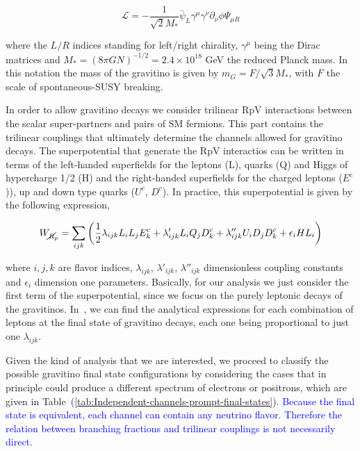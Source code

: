 \documentclass[a4paper,11pt]{article}
\newcommand*{\blue}{\textcolor{blue}}
\begin{document}
\begin{equation}
  \mathcal{L} = −\frac{1}{\sqrt{2}M_*}\bar{\psi}_L\gamma^\mu\gamma^\nu\partial_\nu\phi\Psi_{\mu R}
\end{equation}

\noindent where the $L/R$ indices standing for left/right chirality, $\gamma^\mu$ being the Dirac matrices and $M_* = (8\pi G N)^{-1/2} = 2.4\times 10^{18}$ GeV the reduced Planck mass. In this notation the mass of the gravitino is given by $m_G = F/\sqrt{3}M_*$, with $F$ the scale of spontaneous-SUSY breaking.

In order to allow gravitino decays we consider trilinear RpV interactions between the scalar super-partners and pairs of SM fermions. This part contains the trilinear couplings that ultimately determine the channels allowed for gravitino decays. The superpotential that generate the RpV interactios can be written in terms of the left-handed superfields for the leptons (L), quarks (Q) and Higgs of hypercharge 1/2 (H) and the right-handed superfields for the charged leptons ($E^c$)), up and down type quarks ($U^c$, $D^c$). In practice, this superpotential is given by the following expression,

\begin{equation}
 W_{\cancel{R}_p} = \sum_{ijk}\left(\frac{1}{2}\lambda_{ijk}L_i L_j E_k^c + \lambda'_{ijk}L_i Q_j D_k^c + \lambda''_{ijk}U_i D_j D_k^c + \epsilon_iHL_i\right)
\end{equation}

\noindent where $i,j,k$ are flavor indices, $\lambda_{ijk}$, $\lambda'_{ijk}$, $\lambda''_{ijk}$ dimensionless coupling constants and $\epsilon_i$ dimension one parameters. Basically, for our analysis we just consider the first term of the superpotential, since we focus on the purely leptonic decays of the gravitinos. In~\cite{Moreau:2001sr}, we can find the analytical expressions for each combination of leptons at the final state of gravitino decays, each one being proportional to just one $\lambda_{ijk}$. 

Given the kind of analysis that we are interested, we proceed to classify the possible gravitino final state configurations by considering the cases that in principle could produce a different spectrum of electrons or positrons, which are given in Table~(\ref{tab:Independent-channels-prompt-final-states}). \blue{Because the final state is equivalent, 
each channel can contain any neutrino flavor. Therefore the relation between branching fractions and trilinear couplings is not necessarily direct.}
\end{document}
